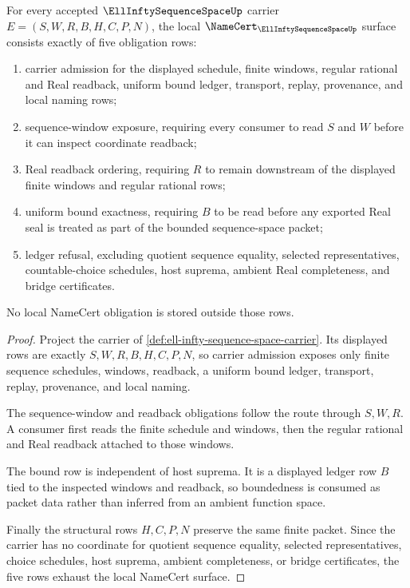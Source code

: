 \begin{theorem}
\label{thm:ell-infty-sequence-space-namecert-obligations}
For every accepted $\EllInftySequenceSpaceUp$ carrier $E=(S,W,R,B,H,C,P,N)$, the local $\NameCert_{\EllInftySequenceSpaceUp}$ surface consists exactly of five obligation rows:
\begin{enumerate}
\item carrier admission for the displayed schedule, finite windows, regular rational and Real readback, uniform bound ledger, transport, replay, provenance, and local naming rows;
\item sequence-window exposure, requiring every consumer to read $S$ and $W$ before it can inspect coordinate readback;
\item Real readback ordering, requiring $R$ to remain downstream of the displayed finite windows and regular rational rows;
\item uniform bound exactness, requiring $B$ to be read before any exported Real seal is treated as part of the bounded sequence-space packet;
\item ledger refusal, excluding quotient sequence equality, selected representatives, countable-choice schedules, host suprema, ambient Real completeness, and bridge certificates.
\end{enumerate}
No local NameCert obligation is stored outside those rows.
\end{theorem}
\begin{proof}
Project the carrier of \autoref{def:ell-infty-sequence-space-carrier}. Its displayed rows are exactly $S,W,R,B,H,C,P,N$, so carrier admission exposes only finite sequence schedules, windows, readback, a uniform bound ledger, transport, replay, provenance, and local naming.

The sequence-window and readback obligations follow the route through $S,W,R$. A consumer first reads the finite schedule and windows, then the regular rational and Real readback attached to those windows.

The bound row is independent of host suprema. It is a displayed ledger row $B$ tied to the inspected windows and readback, so boundedness is consumed as packet data rather than inferred from an ambient function space.

Finally the structural rows $H,C,P,N$ preserve the same finite packet. Since the carrier has no coordinate for quotient sequence equality, selected representatives, choice schedules, host suprema, ambient completeness, or bridge certificates, the five rows exhaust the local NameCert surface.
\end{proof}

